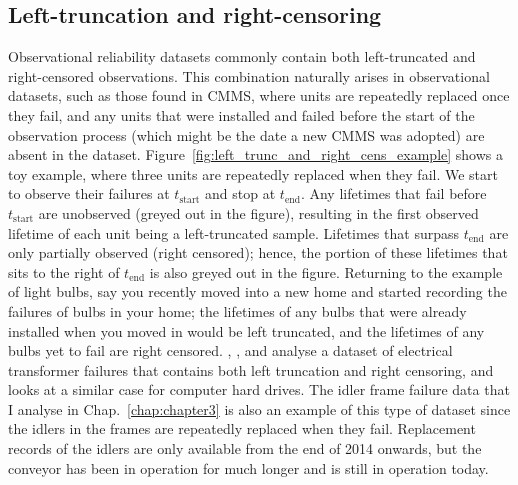 \subsection{Left-truncation and right-censoring} 

Observational reliability datasets commonly contain both left-truncated and right-censored observations. This combination naturally arises in observational datasets, such as those found in CMMS, where units are repeatedly replaced once they fail, and any units that were installed and failed before the start of the observation process (which might be the date a new CMMS was adopted) are absent in the dataset. Figure~\ref{fig:left_trunc_and_right_cens_example} shows a toy example, where three units are repeatedly replaced when they fail. We start to observe their failures at $t_{\text{start}}$ and stop at $t_{\text{end}}$. Any lifetimes that fail before $t_{\text{start}}$ are unobserved (greyed out in the figure), resulting in the first observed lifetime of each unit being a left-truncated sample. Lifetimes that surpass $t_{\text{end}}$ are only partially observed (right censored); hence, the portion of these lifetimes that sits to the right of $t_{\text{end}}$ is also greyed out in the figure. Returning to the example of light bulbs, say you recently moved into a new home and started recording the failures of bulbs in your home; the lifetimes of any bulbs that were already installed when you moved in would be left truncated, and the lifetimes of any bulbs yet to fail are right censored. \citet{hong2009}, \citet{mitra2013}, and \citet{kundu2016} analyse a dataset of electrical transformer failures that contains both left truncation and right censoring, and \citet{mittman2013} looks at a similar case for computer hard drives. The idler frame failure data that I analyse in Chap.~\ref{chap:chapter3} is also an example of this type of dataset since the idlers in the frames are repeatedly replaced when they fail. Replacement records of the idlers are only available from the end of 2014 onwards, but the conveyor has been in operation for much longer and is still in operation today.


